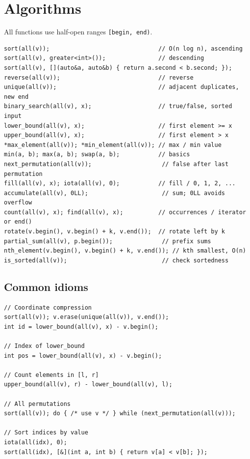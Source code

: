 \section{Algorithms}

All functions use half-open ranges \texttt{[begin, end)}.
\begin{lstlisting}
sort(all(v));                               // O(n log n), ascending
sort(all(v), greater<int>());               // descending
sort(all(v), [](auto&a, auto&b) { return a.second < b.second; });
reverse(all(v));                            // reverse
unique(all(v));                             // adjacent duplicates, new end
binary_search(all(v), x);                   // true/false, sorted input
lower_bound(all(v), x);                     // first element >= x
upper_bound(all(v), x);                     // first element > x
*max_element(all(v)); *min_element(all(v)); // max / min value
min(a, b); max(a, b); swap(a, b);           // basics
next_permutation(all(v));                    // false after last permutation
fill(all(v), x); iota(all(v), 0);           // fill / 0, 1, 2, ...
accumulate(all(v), 0LL);                     // sum; 0LL avoids overflow
count(all(v), x); find(all(v), x);          // occurrences / iterator or end()
rotate(v.begin(), v.begin() + k, v.end());  // rotate left by k
partial_sum(all(v), p.begin());              // prefix sums
nth_element(v.begin(), v.begin() + k, v.end()); // kth smallest, O(n)
is_sorted(all(v));                           // check sortedness
\end{lstlisting}

\subsection{Common idioms}
\begin{lstlisting}
// Coordinate compression
sort(all(v)); v.erase(unique(all(v)), v.end());
int id = lower_bound(all(v), x) - v.begin();

// Index of lower_bound
int pos = lower_bound(all(v), x) - v.begin();

// Count elements in [l, r]
upper_bound(all(v), r) - lower_bound(all(v), l);

// All permutations
sort(all(v)); do { /* use v */ } while (next_permutation(all(v)));

// Sort indices by value
iota(all(idx), 0);
sort(all(idx), [&](int a, int b) { return v[a] < v[b]; });
\end{lstlisting}

